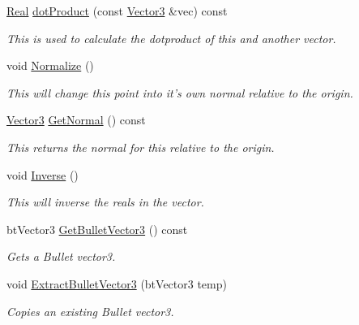 \begin{DoxyCompactItemize}
\hyperlink{namespacephys_af7eb897198d265b8e868f45240230d5f}{Real} \hyperlink{classphys_1_1Vector3_ac30ef9729b1a4e6001f5f5219a88176d}{dotProduct} (const \hyperlink{classphys_1_1Vector3}{Vector3} \&vec) const 
\begin{DoxyCompactList}\small\item\em This is used to calculate the dotproduct of this and another vector. \item\end{DoxyCompactList}\item 
void \hyperlink{classphys_1_1Vector3_ae39fe0545df88148bcd668b3bd2a4388}{Normalize} ()
\begin{DoxyCompactList}\small\item\em This will change this point into it's own normal relative to the origin. \item\end{DoxyCompactList}\item 
\hyperlink{classphys_1_1Vector3}{Vector3} \hyperlink{classphys_1_1Vector3_a81e11f45378758391c97ec55b519951c}{GetNormal} () const 
\begin{DoxyCompactList}\small\item\em This returns the normal for this relative to the origin. \item\end{DoxyCompactList}\item 
void \hyperlink{classphys_1_1Vector3_a30af9c8ae51596fa00fa7f350f9668f5}{Inverse} ()
\begin{DoxyCompactList}\small\item\em This will inverse the reals in the vector. \item\end{DoxyCompactList}\item 
btVector3 \hyperlink{classphys_1_1Vector3_adf4129007ee41f5a03e97502f2df9c41}{GetBulletVector3} () const 
\begin{DoxyCompactList}\small\item\em Gets a Bullet vector3. \item\end{DoxyCompactList}\item 
void \hyperlink{classphys_1_1Vector3_a24ae86b068340be6727877f8c6c1a313}{ExtractBulletVector3} (btVector3 temp)
\begin{DoxyCompactList}\small\item\em Copies an existing Bullet vector3. \item\end{DoxyCompactList}\item 

\end{DoxyCompactItemize}

